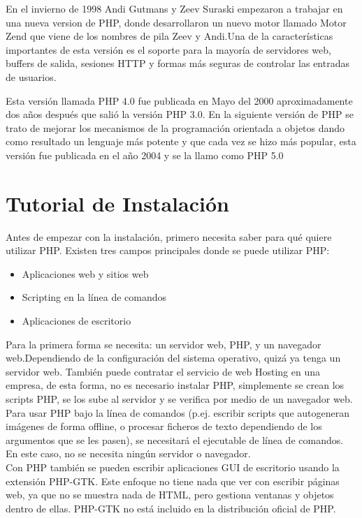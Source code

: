 \documentclass[11pt]{article} %
\begin{document}
En el invierno de 1998 Andi Gutmans y Zeev Suraski empezaron a trabajar en una nueva version de PHP, donde desarrollaron un nuevo motor llamado Motor Zend que viene de los nombres de pila Zeev y Andi.Una de la características importantes de esta versión es el soporte para la mayoría de servidores web, buffers de salida, sesiones HTTP y formas más seguras de controlar las entradas de usuarios.

Esta versión llamada PHP 4.0 fue publicada en Mayo del 2000 aproximadamente  dos años después que salió la versión PHP 3.0.
En la siguiente versión de PHP se trato de mejorar los mecanismos de la programación orientada a objetos dando como resultado un lenguaje más potente y que cada vez se hizo más popular, esta versión fue publicada en el año 2004 y se la llamo como PHP 5.0 
 

\section{Tutorial de Instalación}


Antes de empezar con la instalación, primero necesita saber para qué quiere utilizar PHP. Existen tres campos principales donde se puede utilizar PHP:

\begin {itemize}

\item Aplicaciones web y sitios web
\item Scripting en la línea de comandos
\item Aplicaciones de escritorio
\end {itemize}

Para la primera forma se necesita: un servidor web, PHP,  y un navegador web.Dependiendo de la configuración del sistema operativo, quizá ya tenga un servidor web. También puede contratar el servicio de web Hosting en una empresa, de esta forma, no es necesario instalar PHP, simplemente se crean los scripts PHP, se los sube al servidor y se verifica por medio de un navegador web.\\

Para usar PHP bajo la línea de comandos (p.ej. escribir scripts que autogeneran imágenes de forma offline, o procesar ficheros de texto dependiendo de los argumentos que se les pasen),  se necesitará el ejecutable de línea de comandos. En este caso, no se necesita ningún servidor o navegador.\\

Con PHP también se pueden escribir aplicaciones GUI de escritorio usando la extensión PHP-GTK. Este enfoque no tiene nada que ver con escribir páginas web, ya que no se muestra nada de HTML, pero gestiona ventanas y objetos dentro de ellas. PHP-GTK no está incluido en la distribución oficial de PHP.
\end{document}
